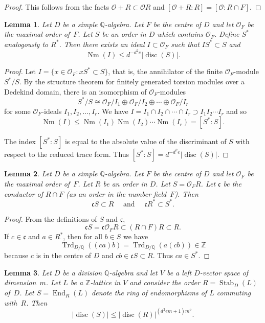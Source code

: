 \documentclass[11pt]{article}
\numberwithin{equation}{section}
\newcommand{\bQ}{\mathbb{Q}}
\newcommand{\bZ}{\mathbb{Z}}
\newcommand{\cO}{\mathcal{O}}
\newcommand{\fc}{\mathfrak{c}}
\DeclareMathOperator{\disc}{disc}
\DeclareMathOperator{\End}{End}
\DeclareMathOperator{\Nm}{Nm}
\DeclareMathOperator{\Stab}{Stab}
\DeclareMathOperator{\Trd}{Trd}
\newcommand{\abs}[1]{\lvert #1 \rvert}
\newtheorem{lemma}{Lemma}[section]
\begin{document}
\begin{proof}
This follows from the facts $\cO + R \subset \cO R$ and $[\cO + R : R] = [\cO : R \cap F]$.
\end{proof}

\begin{lemma} \label{dual-ideal}
Let $D$ be a simple $\bQ$-algebra.
Let $F$ be the centre of $D$ and let $\cO_F$ be the maximal order of~$F$.
Let $S$ be an order in $D$ which contains $\cO_F$.
Define $S^*$ analogously to $R^*$.
Then there exists an ideal $I \subset \cO_F$ such that $IS^* \subset S$ and
\[
\Nm(I) \leq d^{-d^2e} \abs{\disc(S)}.
\]
\end{lemma}

\begin{proof}
Let $I = \{ x \in \cO_F : xS^* \subset S \}$, that is, the annihilator of the finite $\cO_F$\nobreakdash-mod\-ule $S^*/S$.
By the structure theorem for finitely generated torsion modules over a Dedekind domain, there is an isomorphism of $\cO_F$-modules
\[
S^*/S \cong \cO_F/I_1 \oplus \cO_F/I_2 \oplus \dotsb \oplus \cO_F/I_r
\]
for some $\cO_F$-ideals $I_1, I_2, \dotsc, I_r$.
We have $I = I_1 \cap I_2 \cap \dotsb \cap I_r \supset I_1 I_2 \dotsm I_r$ and so
\[
\Nm(I) \leq \Nm(I_1)\Nm(I_2) \dotsm \Nm(I_r) = [S^*:S].
\]

The index $[S^*:S]$ is equal to the absolute value of the discriminant of $S$ with respect to the reduced trace form. Thus $[S^*:S] = d^{-d^2e} \abs{\disc(S)}$.
\end{proof}

\begin{lemma} \label{conductor-S}
Let $D$ be a simple $\bQ$-algebra.
Let $F$ be the centre of $D$ and let $\cO_F$ be the maximal order of~$F$.
Let $R$ be an order in $D$.
Let $S = \cO_F R$.
Let $\fc$ be the conductor of $R \cap F$ (as an order in the number field~$F$).
Then
\[
\fc S \subset R \quad \text{ and } \quad \fc R^* \subset S^*.
\]
\end{lemma}

\begin{proof}
From the definitions of $S$ and $\fc$,
\[
\fc S = \fc \cO_F R \subset (R \cap F) R \subset R.
\]
If $c \in \fc$ and $a \in R^*$, then for all $b \in S$ we have
\[
\Trd_{D/\bQ}((ca)b) = \Trd_{D/\bQ}(a(cb)) \in \bZ
\]
because $c$ is in the centre of $D$ and $cb \in \fc S \subset R$.
Thus $ca \in S^*$.
\end{proof}

\begin{lemma} \label{disc-R-S}
Let $D$ be a division $\bQ$-algebra and let $V$ be a left $D$-vector space of dimension~$m$.
Let $L$ be a $\bZ$-lattice in $V$ and consider the order $R = \Stab_D(L)$ of~$D$.
Let $S = \End_R(L)$ denote the ring of endomorphisms of $L$ commuting with~$R$.
Then
\[
\abs{\disc(S)} \leq \abs{\disc(R)}^{(d^2em+1)m^2}.
\]
\end{lemma}
\end{document}
